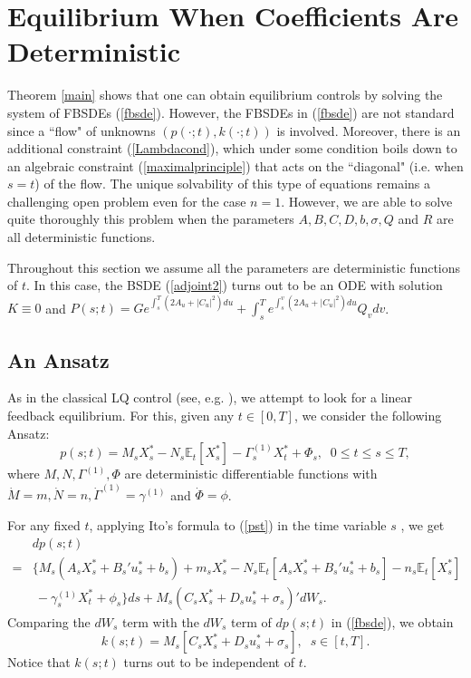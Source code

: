 \documentclass[final]{siamltex}
\begin{document}
\section{Equilibrium When Coefficients Are  Deterministic}\label{Deterministic-case}

Theorem \ref{main} shows that one can obtain  equilibrium  controls by solving the system of FBSDEs (\ref{fbsde}). However, the FBSDEs in (\ref{fbsde}) are not standard since a ``flow" of unknowns $(p(\cdot;t), k(\cdot;t))$ is involved. Moreover,  there is an additional
constraint (\ref{Lambdacond}), which under some condition boils down to an algebraic constraint (\ref{maximalprinciple})
that acts on the ``diagonal" (i.e. when $s=t$) of the flow. 
The unique solvability of this type of equations remains a challenging open problem even for the case $n=1$.
However, we are able to solve quite thoroughly this problem when the parameters
$A,B, C, D,b,\sigma, Q$ and $R$ are all deterministic functions.

Throughout this section we assume all the parameters are deterministic functions of $t$. In this case,
the BSDE (\ref{adjoint2}) turns out to be an ODE with solution
$K\equiv 0$ and
$P(s;t)=Ge^{\int_s^T(2A_u+|C_u|^2)du}+\int_s^Te^{\int_s^v(2A_u+|C_u|^2)du}Q_vdv$.

\subsection{An Ansatz}

As in the classical LQ control (see, e.g. \cite{YZ}), we attempt to look for a linear feedback equilibrium.
For this, given any $t\in [0,T]$, we consider the following
Ansatz:
\begin{equation}\label{pst}
p(s;t)=M_sX^*_s -N_s\mathbb E_t[X^*_s] -\Gamma^{(1)}_s X_t^*+\Phi_s,\;\;0\leq t\leq s\leq T,
\end{equation}
where  $M,N,\Gamma^{(1)},\Phi$ are deterministic differentiable functions with $\dot M=m, \dot N=n, \dot \Gamma^{(1)}=\gamma^{(1)}$ and $\dot \Phi=\phi$.

For any fixed $t$, applying Ito's formula to (\ref{pst}) in the time variable $s$ ,
we get
\begin{equation}\label{pst2}
\begin{array}{rl}
&dp(s;t)\\
=&\{M_s(A_sX^*_s+B_s'u^*_s+b_s)+m_sX^*_s-N_s {\mathbb{E}_t\left[{A_sX^*_s+B_s'u^*_s+b_s}\right]}-n_s{\mathbb{E}_t\left[{X^*_s}\right]}\\
&\ -\gamma_s^{(1)}X^*_t+\phi_s\}ds
+M_s(C_sX_s^*+D_su^*_s+\sigma_s)'dW_s.
\end{array}
\end{equation}
Comparing the
 $dW_s$ term with the $dW_s$  term  of $dp(s;t)$ in (\ref{fbsde}), we obtain
\begin{equation}\label{kst}
k(s;t)=M_s[C_sX^*_s+D_su^*_s+\sigma_s],\;\;s\in [t,T].
\end{equation}
Notice that $k(s;t)$ turns out to be independent of $t$.
\end{document}
